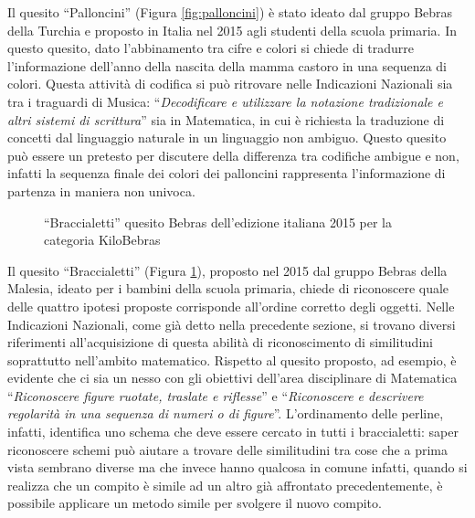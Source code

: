 \documentclass[12pt]{report}
\begin{document}
Il quesito ``Palloncini'' (Figura \ref{fig:palloncini}) è stato ideato dal gruppo Bebras della Turchia e proposto in Italia nel 2015 agli studenti della scuola primaria. In questo quesito, dato l'abbinamento tra cifre e colori si chiede di tradurre l'informazione dell'anno della nascita della mamma castoro in una sequenza di colori. Questa attività di codifica si può ritrovare nelle Indicazioni Nazionali sia tra i traguardi di Musica: ``\textit{Decodificare e utilizzare la notazione tradizionale e altri sistemi di scrittura}'' sia in Matematica, in cui è richiesta la traduzione di concetti dal linguaggio naturale in un linguaggio non ambiguo. Questo quesito può essere un pretesto per discutere della differenza tra codifiche ambigue e non, infatti la sequenza finale dei colori dei palloncini rappresenta l'informazione di partenza in maniera non univoca.



\bigskip
\begin{figure}[h]
	\centering
	\caption{``Braccialetti'' quesito Bebras dell'edizione italiana 2015 per la categoria KiloBebras}\label{fig:braccialetti}
\end{figure}

Il quesito ``Braccialetti'' (Figura \ref{fig:braccialetti}), proposto nel 2015 dal gruppo Bebras della Malesia, ideato per i bambini della scuola primaria, chiede di riconoscere quale delle quattro ipotesi proposte corrisponde all'ordine corretto degli oggetti. Nelle Indicazioni Nazionali, come già detto nella precedente sezione, si trovano diversi riferimenti all'acquisizione di questa abilità di riconoscimento di similitudini soprattutto nell'ambito matematico. Rispetto al quesito proposto, ad esempio, è evidente che ci sia un nesso con gli obiettivi dell'area disciplinare di Matematica ``\textit{Riconoscere figure ruotate, traslate e riflesse}'' e ``\textit{Riconoscere e descrivere regolarità in una sequenza di numeri o di figure}''. L'ordinamento delle perline, infatti, identifica uno schema che deve essere cercato in tutti i braccialetti: saper riconoscere schemi può aiutare a trovare delle similitudini tra cose che a prima vista sembrano diverse ma che invece hanno qualcosa in comune infatti, quando si realizza che un compito è simile ad un altro già affrontato precedentemente, è possibile applicare un metodo simile per svolgere il nuovo
compito.
\end{document}
